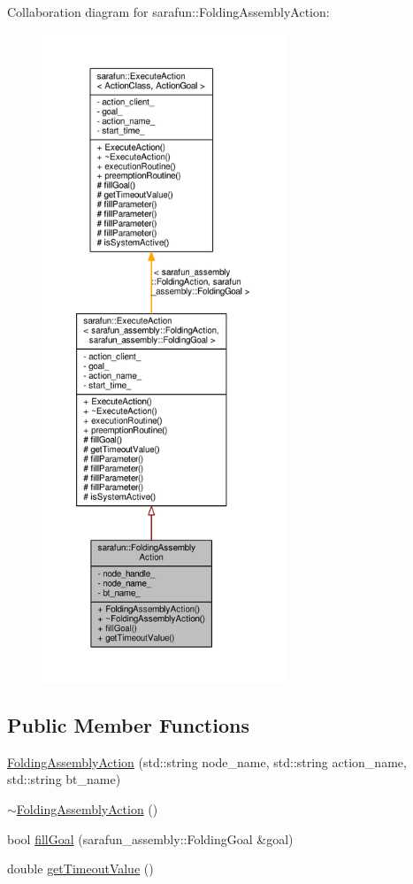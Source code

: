 Collaboration diagram for sarafun\-:\-:Folding\-Assembly\-Action\-:
\nopagebreak
\begin{figure}[H]
\begin{center}
\leavevmode
\includegraphics[height=550pt]{de/d2e/classsarafun_1_1FoldingAssemblyAction__coll__graph}
\end{center}
\end{figure}
\subsection*{Public Member Functions}
\begin{DoxyCompactItemize}
\item 
\hyperlink{classsarafun_1_1FoldingAssemblyAction_afc2da251f362a62c892f41d8e0bea0e5_afc2da251f362a62c892f41d8e0bea0e5}{Folding\-Assembly\-Action} (std\-::string node\-\_\-name, std\-::string action\-\_\-name, std\-::string bt\-\_\-name)
\item 
\hyperlink{classsarafun_1_1FoldingAssemblyAction_a0e38e473ec7b9327dc0a4d32e11cc0d6_a0e38e473ec7b9327dc0a4d32e11cc0d6}{$\sim$\-Folding\-Assembly\-Action} ()
\item 
bool \hyperlink{classsarafun_1_1FoldingAssemblyAction_a51597860319456f359d03c3e27c2fb96_a51597860319456f359d03c3e27c2fb96}{fill\-Goal} (sarafun\-\_\-assembly\-::\-Folding\-Goal \&goal)
\item 
double \hyperlink{classsarafun_1_1FoldingAssemblyAction_a14174e375aa1b8d5b63159f275b7d971_a14174e375aa1b8d5b63159f275b7d971}{get\-Timeout\-Value} ()
\end{DoxyCompactItemize}
